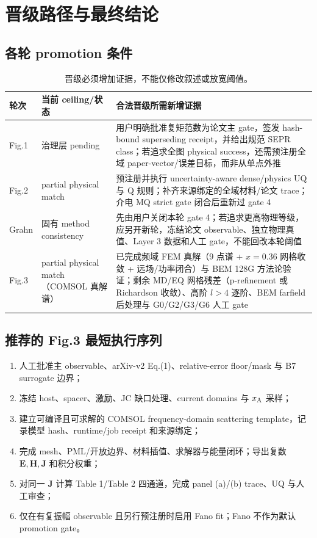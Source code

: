 \section{晋级路径与最终结论}

\subsection{各轮 promotion 条件}

\begin{table}[H]
\centering
\footnotesize
\begin{tabularx}{\textwidth}{p{1.4cm}p{3.0cm}X}
\toprule
轮次 & 当前 ceiling/状态 & 合法晋级所需新增证据 \\
\midrule
Fig.1 & 治理层 pending & 用户明确批准复矩范数为论文主 gate，签发 hash-bound superseding receipt，并给出规范 SEPR class；若追求全图 physical success，还需预注册全域 paper-vector/误差目标，而非从单点外推 \\
Fig.2 & partial physical match & 预注册并执行 uncertainty-aware dense/physics UQ 与 Q 规则；补齐来源绑定的全域材料/论文 trace；介电 MQ strict gate 闭合后重新过 gate 4 \\
Grahn & 固有 method consistency & 先由用户关闭本轮 gate 4；若追求更高物理等级，应另开新轮，冻结论文 observable、独立物理真值、Layer 3 数据和人工 gate，不能回改本轮阈值 \\
Fig.3 & partial physical match（COMSOL 真解谱）& 已完成频域 FEM 真解（9 点谱 + $x=0.36$ 网格收敛 + 远场/功率闭合）与 BEM 128G 方法论验证；剩余 MD/EQ 网格残差（p-refinement 或 Richardson 收敛）、高阶 $l>4$ 逐阶、BEM farfield 后处理与 G0/G2/G3/G6 人工 gate \\
\bottomrule
\end{tabularx}
\caption{晋级必须增加证据，不能仅修改叙述或放宽阈值。}
\end{table}

\subsection{推荐的 Fig.3 最短执行序列}

\begin{enumerate}
  \item 人工批准主 observable、arXiv-v2 Eq.(1)、relative-error floor/mask 与 B7 surrogate 边界；
  \item 冻结 host、spacer、激励、JC 缺口处理、current domains 与 $x_{\rm A}$ 采样；
  \item 建立可编译且可求解的 COMSOL frequency-domain scattering template，记录模型 hash、runtime/job receipt 和来源绑定；
  \item 完成 mesh、PML/开放边界、材料插值、求解器与能量闭环；导出复数 $\mathbf E,\mathbf H,\mathbf J$ 和积分权重；
  \item 对同一 $\mathbf J$ 计算 Table 1/Table 2 四通道，完成 panel (a)/(b) trace、UQ 与人工审查；
  \item 仅在有复振幅 observable 且另行预注册时启用 Fano fit；Fano 不作为默认 promotion gate。
\end{enumerate}

